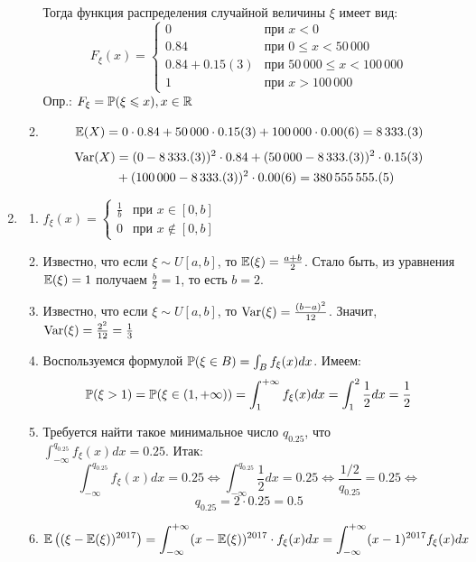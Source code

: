 \begin{enumerate}
\begin{enumerate}
Тогда функция распределения случайной величины $\xi$ имеет вид:
\[
F_{\xi} (x) =
\begin{cases}
0 & \text{при } x<0 \\
0.84 & \text{при } 0 \leq x < 50\,000 \\
0.84 + 0.15(3) & \text{при } 50\,000
\leq x < 100\,000 \\
1 & \text{при } x > 100\,000
\end{cases}
\]
Опр.: $F_{\xi} = \P (\xi \leq x ), x \in \mathbb{R}$
\item \[
\E (X) = 0 \cdot 0.84 + 50\,000 \cdot 0.15(3) + 100\,000 \cdot 0.00(6) = 8\,333.(3)
\]
\begin{align*}
\Var(X) &= (0 - 8\,333.(3))^2 \cdot 0.84 + (50\,000-8\,333.(3))^2 \cdot 0.15(3) \\
&+ (100\,000 - 8\,333.(3))^2 \cdot 0.00(6) = 380\,555\,555.(5)
\end{align*}
\end{enumerate}
\item
\begin{enumerate}
\item $ f_{\xi} (x)=
\begin{cases}
\frac{1}{b} & \text{при } x \in [0, b] \\
0 & \text{при } x \notin [0, b]
\end{cases}
$
\item  Известно, что если $\xi \sim U[a, b]$, то $\E (\xi) = \frac{a+b}{2}$. Стало быть, из уравнения $\E (\xi) = 1$ получаем $\frac{b}{2} = 1$,  то есть $b=2$.
\item Известно, что если $\xi \sim U[a, b]$, то $\Var (\xi) = \frac{(b-a)^2}{12}$. Значит, $\Var (\xi) = \frac{2^2}{12} = \frac{1}{3}$
\item Воспользуемся формулой $\P (\xi \in B ) = \int_B f_{\xi} (x) dx$. Имеем:
\[
\P (\xi > 1 ) = \P (\xi \in (1, + \infty) ) = \int_{1}^{+ \infty} f_{\xi} (x) dx = \int_{1}^{2} \frac{1}{2} dx = \frac{1}{2}
\]
\item Требуется найти такое минимальное число $q_{0.25}$, что $\int_{-\infty}^{q_{0.25}} f_{\xi} (x) dx = 0.25$. Итак:
\[
\int_{-\infty}^{q_{0.25}} f_{\xi} (x) dx = 0.25 \Leftrightarrow \int_{-\infty}^{q_{0.25}} \frac{1}{2} dx = 0.25 \Leftrightarrow \frac{1/2}{q_{0.25}} = 0.25 \Leftrightarrow
\]
\[
q_{0.25} = 2 \cdot 0.25 = 0.5
\]
\item
\begin{align*}
\E \left((\xi - \E(\xi))^{2017} \right) &= \int_{-\infty}^{+\infty} (x- \E(\xi) )^{2017} \cdot f_{\xi} (x) dx = \int_{-\infty}^{+\infty} (x-1)^{2017} f_{\xi} (x) dx \\

\end{align*}
\end{enumerate}
\end{enumerate}
